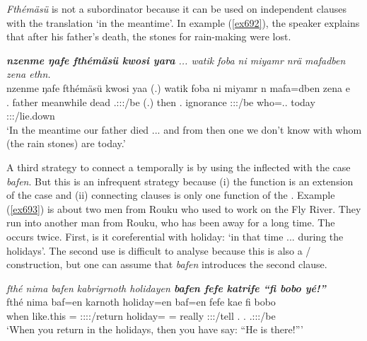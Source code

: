 \emph{Fthémäsü} is not a subordinator because it can be used on independent clauses with the translation `in the meantime'. In example (\ref{ex692}), the speaker explains that after his father's death, the stones for rain-making were lost.

\begin{exe}
	\ex \emph{\textbf{nzenme ŋafe fthémäsü kwosi yara} ... watik foba ni miyamr nrä mafadben zena ethn.}\\
	\gll nzenme ŋafe fthémäsü kwosi yaa (.) watik foba ni miyamr n mafa=dben zena e\\
	\Fnsg.{\Poss} father meanwhile dead \Tsg.\Masc:\Sbj:\Pst:\Ipfv/be (.) then \Dist.{\Abl} {\Fnsg} ignorance \Fpl:\Sbj:\Nonpast:\Ipfv/be who=\Loc.\Anim.{\Sg} today \Stpl:\Sbj:\Nonpast:\Ipfv/lie.down\\
	\trans `In the meantime our father died ... and from then one we don't know with whom (the rain stones) are today.'
	\label{ex692}
\end{exe}

\largerpage
A third strategy to connect a  temporally is by using the  inflected with the  case \emph{bafen}. But this is an infrequent strategy because (i) the  function is an extension of the  case and (ii) connecting clauses is only one function of the . Example (\ref{ex693}) is about two men from Rouku who used to work on the Fly River. They run into another man from Rouku, who has been away for a long time. The  occurs twice. First, is it coreferential with holiday: `in that time ... during the holidays'. The second use is difficult to analyse because this is also a / construction, but one can assume that \emph{bafen} introduces the second clause.

\begin{exe}
	\ex \emph{fthé nima bafen kabrigrnoth holidayen \textbf{bafen fefe katrife ``fi bobo yé!''}}\\
	\gll fthé nima baf=en karnoth holiday=en baf=en fefe kae fi bobo \\
	when {like.this} \Recog={\Loc} \Du:\Sbj:\Imp:\Ipfv:\Andat/return holiday={\Loc} \Recog={\Loc} really \Sdu:\Sbj:\Imp:\Pfv/tell \Third.{\Abs} \Med.{\All} \Tsg.\Masc:\Sbj:\Nonpast:\Ipfv/be\\
	\trans `When you return in the holidays, then you have say: ``He is there!'''\\
	\label{ex693}
\end{exe}

